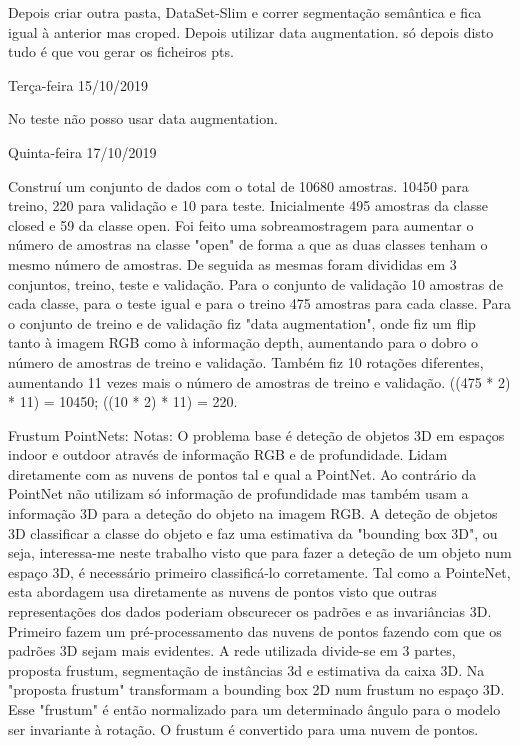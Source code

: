         Depois criar outra pasta, DataSet-Slim e correr segmentação semântica e fica igual à anterior mas croped. 
        Depois utilizar data augmentation.
        só depois disto tudo é que vou gerar os ficheiros pts.
        
        
        \bigskip
        
        Terça-feira 15/10/2019
        
        No teste não posso usar data augmentation.
        
        
        \bigskip
        
        Quinta-feira 17/10/2019
        
        Construí um conjunto de dados com o total de 10680 amostras. 10450 para treino, 220 para validação e 10 para teste. Inicialmente 495 amostras da classe closed e 59 da classe open. Foi feito uma sobreamostragem para aumentar o número de amostras na classe "open" de forma a que as duas classes tenham o mesmo número de amostras. De seguida as mesmas foram divididas em 3 conjuntos, treino, teste e validação. Para o conjunto de validação 10 amostras de cada classe, para o teste igual e para o treino 475 amostras para cada classe. Para o conjunto de treino e de validação fiz "data augmentation", onde fiz um flip tanto à imagem RGB como à informação depth, aumentando para o dobro o número de amostras de treino e validação. Também fiz 10 rotações diferentes, aumentando 11 vezes mais o número de amostras de treino e validação. ((475 * 2) * 11) = 10450; ((10 * 2) * 11) = 220.
        
        Frustum PointNets: Notas:
            O problema base é deteção de objetos 3D em espaços indoor e outdoor através de informação RGB e de profundidade. Lidam diretamente com as nuvens de pontos tal e qual a PointNet. Ao contrário da PointNet não utilizam só informação de profundidade mas também usam a informação 3D para a deteção do objeto na imagem RGB. A deteção de objetos 3D classificar a classe do objeto e faz uma estimativa da "bounding box 3D", ou seja, interessa-me neste trabalho visto que para fazer a deteção de um objeto num espaço 3D, é necessário primeiro classificá-lo corretamente. Tal como a PointeNet, esta abordagem usa diretamente as nuvens de pontos visto que outras representações dos dados poderiam obscurecer os padrões e as invariâncias 3D. Primeiro fazem um pré-processamento das nuvens de pontos fazendo com que os padrões 3D sejam mais evidentes. A rede utilizada divide-se em 3 partes, proposta frustum, segmentação de instâncias 3d e estimativa da caixa 3D. Na "proposta frustum" transformam a bounding box 2D num frustum no espaço 3D. Esse "frustum" é então normalizado para um determinado ângulo para o modelo ser invariante à rotação. O frustum é convertido para uma nuvem de pontos.
            

